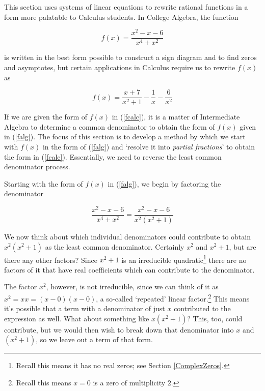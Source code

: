 \documentclass{ximera}
\begin{document}
	\author{Stitz-Zeager}




\setcounter{footnote}{0}

\label{ParFrac}

\setlength{\extrarowheight}{0pt}

This section uses systems of linear equations to rewrite rational functions in a form more palatable to Calculus students. In College Algebra, the function 

\begin{equation} \label{falg} f(x) = \frac{x^2-x-6}{x^4+x^2} \tag{1} \end{equation}

is written in the best form possible to construct a sign diagram and to find zeros and asymptotes, but certain applications in Calculus require us to rewrite $f(x)$ as 

\begin{equation} \label{fcalc} f(x) = \frac{x+7}{x^2+1} - \frac{1}{x} - \frac{6}{x^2}  \tag{2} \end{equation}

If we are given the form of $f(x)$ in (\ref{fcalc}), it is a matter of Intermediate Algebra to determine a common denominator to obtain the form of $f(x)$ given in (\ref{falg}).  The focus of this section is to develop a method by which we start with $f(x)$ in the form of (\ref{falg}) and `resolve it into  \textit{partial fractions}' to obtain the form in (\ref{fcalc}).  Essentially, we need to reverse the least common denominator process.  

Starting with the form of $f(x)$ in (\ref{falg}), we begin by factoring the denominator

\[ \frac{x^2-x-6}{x^4+x^2} =  \frac{x^2-x-6}{x^2 \left(x^2+1\right)} \]

We now think about which individual denominators could contribute to obtain  $x^2 \left(x^2+1\right)$ as the least common denominator.  Certainly $x^2$ and $x^2+1$, but are there any other factors?  Since $x^2+1$ is an irreducible quadratic\footnote{Recall this means it has no real zeros;  see Section \ref{ComplexZeros}.} there are no factors of it that have real coefficients which can contribute to the denominator.  

The factor $x^2$, however, is not irreducible, since we can think of it as $x^2 = xx = (x-0)(x-0)$, a so-called `repeated' linear factor.\footnote{Recall this means $x=0$ is a zero of multiplicity $2$.}   This means it's possible that a term with a denominator of just $x$ contributed to the expression as well.  What about something like $x \left(x^2+1\right)$?  This, too, could contribute, but we would then wish to break down that denominator into $x$ and $\left(x^2+1\right)$, so we leave out a term of that form.  
\end{document}

